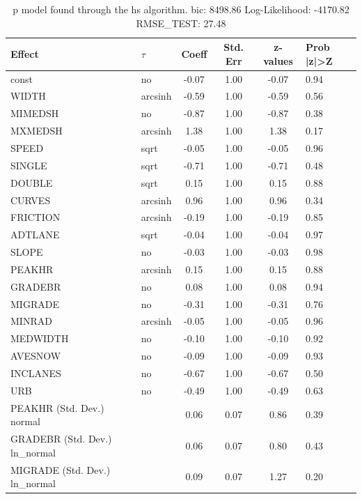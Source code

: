 \begin{table}
	\caption{p model found through the hs algorithm. bic: 8498.86 Log-Likelihood: -4170.82 RMSE_TEST: 27.48}
	\begin{center}
		\begin{tabular}{|l|l|c|c|c|l|}
			\hline
			Effect & $\tau$ & Coeff & Std. Err & z-values & Prob |z|>Z \\
			\hline
			const & no & -0.07 & 1.00 & -0.07 & 0.94 \\
			\hline
			WIDTH & arcsinh & -0.59 & 1.00 & -0.59 & 0.56 \\
			\hline
			MIMEDSH & no & -0.87 & 1.00 & -0.87 & 0.38 \\
			\hline
			MXMEDSH & arcsinh & 1.38 & 1.00 & 1.38 & 0.17 \\
			\hline
			SPEED & sqrt & -0.05 & 1.00 & -0.05 & 0.96 \\
			\hline
			SINGLE & sqrt & -0.71 & 1.00 & -0.71 & 0.48 \\
			\hline
			DOUBLE & sqrt & 0.15 & 1.00 & 0.15 & 0.88 \\
			\hline
			CURVES & arcsinh & 0.96 & 1.00 & 0.96 & 0.34 \\
			\hline
			FRICTION & arcsinh & -0.19 & 1.00 & -0.19 & 0.85 \\
			\hline
			ADTLANE & sqrt & -0.04 & 1.00 & -0.04 & 0.97 \\
			\hline
			SLOPE & no & -0.03 & 1.00 & -0.03 & 0.98 \\
			\hline
			PEAKHR & arcsinh & 0.15 & 1.00 & 0.15 & 0.88 \\
			\hline
			GRADEBR & no & 0.08 & 1.00 & 0.08 & 0.94 \\
			\hline
			MIGRADE & no & -0.31 & 1.00 & -0.31 & 0.76 \\
			\hline
			MINRAD & arcsinh & -0.05 & 1.00 & -0.05 & 0.96 \\
			\hline
			MEDWIDTH & no & -0.10 & 1.00 & -0.10 & 0.92 \\
			\hline
			AVESNOW & no & -0.09 & 1.00 & -0.09 & 0.93 \\
			\hline
			INCLANES & no & -0.67 & 1.00 & -0.67 & 0.50 \\
			\hline
			URB & no & -0.49 & 1.00 & -0.49 & 0.63 \\
			\hline
			PEAKHR (Std. Dev.) normal &  & 0.06 & 0.07 & 0.86 & 0.39 \\
			\hline
			GRADEBR (Std. Dev.) ln_normal &  & 0.06 & 0.07 & 0.80 & 0.43 \\
			\hline
			MIGRADE (Std. Dev.) ln_normal &  & 0.09 & 0.07 & 1.27 & 0.20 \\

\end{tabular}
\end{center}
\end{table}
